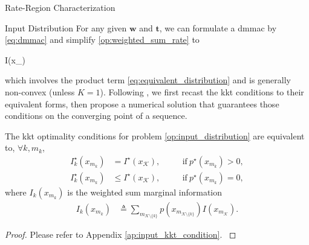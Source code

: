 \begin{section}{Rate-Region Characterization}
	\begin{subsection}{Input Distribution}
		\label{sc:input_distribution}
		For any given $\mathbf{w}$ and $\mathbf{t}$, we can formulate a \gls{dmmac} by \eqref{eq:dmmac} and simplify \eqref{op:weighted_sum_rate} to
		\begin{maxi!}
			{}{I(x_{})}{\label{op:input_distribution}}{}
			\addConstraint{\eqref{co:sum_probability},\eqref{co:nonnegative_probability},}
		\end{maxi!}
		which involves the product term \eqref{eq:equivalent_distribution} and is generally non-convex (unless $K=1$).
		Following \cite{Rezaeian2004}, we first recast the \gls{kkt} conditions to their equivalent forms, then propose a numerical solution that guarantees those conditions on the converging point of a sequence.
		\begin{proposition}
			The \gls{kkt} optimality conditions for problem \eqref{op:input_distribution} are equivalent to, $\forall k,m_k$,
			\begin{subequations}
				\label{eq:input_kkt_condition}
				\begin{alignat}{2}
					I_k^\star(x_{m_k}) & = I^\star(x_{\mathcal{K}}), \quad   &  & \text{if} \ p^\star(x_{m_k}) > 0,\label{eq:probable_states} \\
					I_k^\star(x_{m_k}) & \le I^\star(x_{\mathcal{K}}), \quad &  & \text{if} \ p^\star(x_{m_k}) = 0,\label{eq:dropped_states}
				\end{alignat}
			\end{subequations}
			where $I_k(x_{m_k})$ is the weighted sum marginal information
			\begin{align}
				I_k(x_{m_k})
				 & \triangleq \sum_{m_{\mathcal{K} \setminus \{k\}}} p(x_{m_{\mathcal{K} \setminus \{k\}}}) I(x_{m_\mathcal{K}}).
				\label{eq:weighted_sum_marginal_information}
			\end{align}
			\label{pr:input_kkt_condition}
		\end{proposition}

		\begin{proof}
			Please refer to Appendix \ref{ap:input_kkt_condition}.
			\label{pf:input_kkt_condition}
		\end{proof}


\end{subsection}
\end{section}
